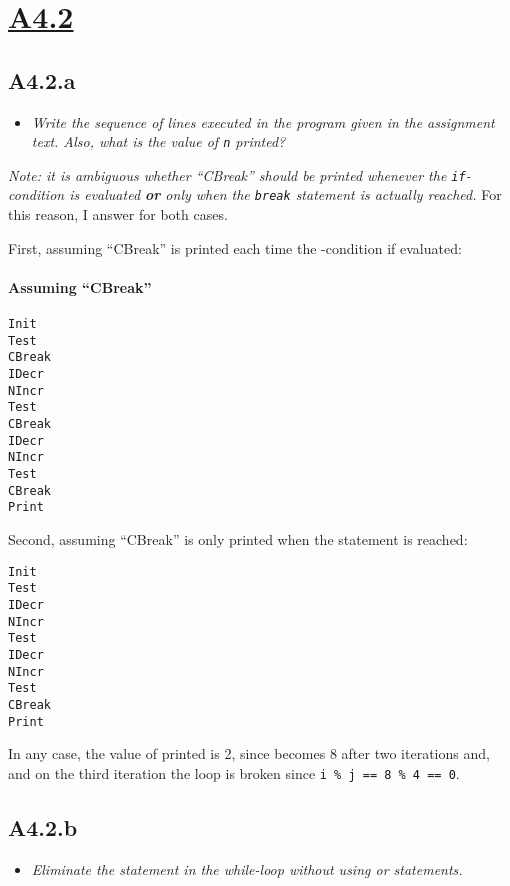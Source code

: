 \newpage
\section{\underline{A4.2}}

\subsection{A4.2.a}

\begin{itemize}
  \item \emph{Write the sequence of lines executed in the program given in the
    assignment text. Also, what is the value of \emph{\texttt{n}} printed?}
\end{itemize}


\emph{Note: it is ambiguous whether \emph{``CBreak''} should be printed whenever
the \emph{\texttt{if}}-condition is evaluated \emph{\textbf{or}} only when the
\emph{\texttt{break}} statement is actually reached.} For this reason, I answer
for both cases.

\smallskip

First, assuming ``CBreak'' is printed each time the  -condition if
evaluated:

\paragraph{Assuming ``CBreak''}
\begin{verbatim}
Init
Test
CBreak
IDecr
NIncr
Test
CBreak
IDecr
NIncr
Test
CBreak
Print
\end{verbatim}

Second, assuming ``CBreak'' is only printed when the  statement is
reached:

\begin{verbatim}
Init
Test
IDecr
NIncr
Test
IDecr
NIncr
Test
CBreak
Print
\end{verbatim}

In any case, the value of  printed is 2, since  becomes 8 after two
iterations and, and on the third iteration the loop is broken since \texttt{i \%
j == 8 \% 4 == 0}.

\sectend

\subsection{A4.2.b}

\begin{itemize}
  \item \emph{Eliminate the \emph{} statement in the while-loop
    without using \emph{} or \emph{} statements.}
\end{itemize}

